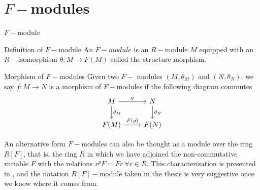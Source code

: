 \documentclass{beamer}
\begin{document}

\section{$F-$modules}

\begin{frame}[fragile]{$F-$module}
\begin{block}{Definition of $F-$module}
An $F-module$ is an $R-$module $M$ equipped with an $R-$isomorphism  $\theta:M \to F(M)$ called the structure morphism.
\end{block}
\begin{block}{Morphism of $F-$modules}
Given two  $F-$ modules  $(M, \theta _M)$ and $(N, \theta _N)$, we say $f:M\to N$ is a morphism of $F-$modules if the following diagram commutes
\[\begin{tikzcd}
	M & N \\
	{F(M)} & {F(N)}
	\arrow["{\theta_M}", from=1-1, to=2-1]
	\arrow["{\theta_N}", from=1-2, to=2-2]
	\arrow["g", from=1-1, to=1-2]
	\arrow["{F(g)}", from=2-1, to=2-2]
\end{tikzcd}\]
\end{block}
\end{frame}


\begin{frame}[fragile]{}
\begin{block}{An alternative form}
$F-$modules can also be thought as a module over the ring  $R[F]$, that is, the ring  $R$ in which we have adjoined the non-commutative variable  $F$ with the relations  $r^pF = Fr \ \forall r\in R$. This characterization is presented in \cite{blickle}, and the notation $R[F]-$module taken in the thesis is very suggestive once we know where it comes from.
\end{block}
\end{frame}
\end{document}
